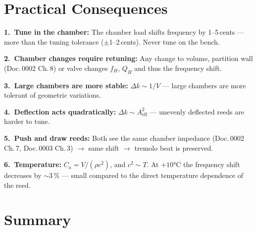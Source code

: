 \documentclass[11pt,a4paper]{article}
\begin{document}
\begin{center}
\end{center}

\section{Practical Consequences}

\textbf{1.\ Tune in the chamber:} The chamber load shifts frequency by 1--5\,cents --- more than the tuning tolerance ($\pm$1--2\,cents). Never tune on the bench.

\textbf{2.\ Chamber changes require retuning:} Any change to volume, partition wall (Doc.\,0002 Ch.\,8) or valve changes $f_H$, $Q_H$ and thus the frequency shift.

\textbf{3.\ Large chambers are more stable:} $\Delta k \sim 1/V$ --- large chambers are more tolerant of geometric variations.

\textbf{4.\ Deflection acts quadratically:} $\Delta k \sim A_\text{eff}^2$ --- unevenly deflected reeds are harder to tune.

\textbf{5.\ Push and draw reeds:} Both see the same chamber impedance (Doc.\,0002 Ch.\,7, Doc.\,0003 Ch.\,3) $\to$ same shift $\to$ tremolo beat is preserved.

\textbf{6.\ Temperature:} $C_a = V/(\rho c^2)$, and $c^2 \sim T$. At $+10$°C the frequency shift decreases by $\sim$3\,\% --- small compared to the direct temperature dependence of the reed.

\section{Summary}
\end{document}
